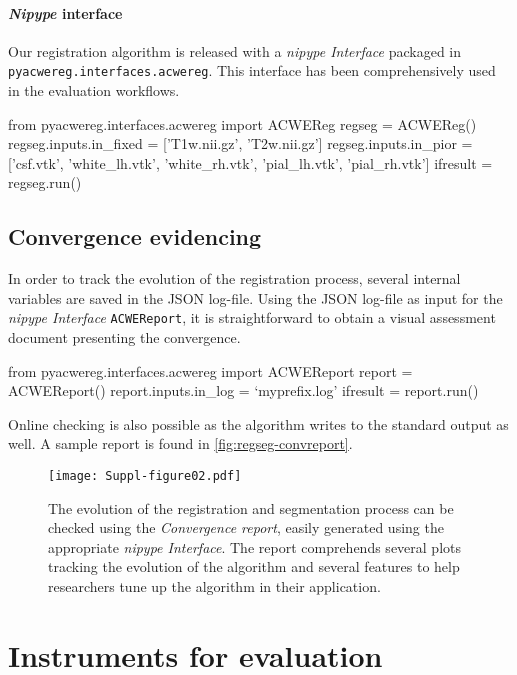 \documentclass[a4paper]{report}
\newcommand*{\codeinline}[1]{\colorbox{listingbg}{\lstinline!#1!}}
\begin{document}
\paragraph{\emph{Nipype} interface}
Our registration algorithm is released with a \emph{nipype Interface} packaged in
  \codeinline{pyacwereg.interfaces.acwereg}.
This interface has been comprehensively used in the evaluation workflows.

\begin{pythoncode}
from pyacwereg.interfaces.acwereg import ACWEReg
regseg = ACWEReg()
regseg.inputs.in_fixed = ['T1w.nii.gz', 'T2w.nii.gz']
regseg.inputs.in_pior = ['csf.vtk', 'white_lh.vtk', 'white_rh.vtk',
                         'pial_lh.vtk', 'pial_rh.vtk']
ifresult = regseg.run()
\end{pythoncode}


\subsection{Convergence evidencing}\label{sec:regseg-convergence_evidence}

In order to track the evolution of the registration process, several internal variables
  are saved in the JSON log-file.
Using the JSON log-file as input for the \emph{nipype Interface}
  \codeinline{ACWEReport}, it is straightforward to obtain
  a visual assessment document presenting the convergence.
\begin{pythoncode}
from pyacwereg.interfaces.acwereg import ACWEReport
report = ACWEReport()
report.inputs.in_log = `myprefix.log'
ifresult = report.run()
\end{pythoncode}

Online checking is also possible as the algorithm writes to the standard output as well.
A sample report is found in \autoref{fig:regseg-convreport}.

\begin{figure}[b]
  \texttt{[image: Suppl-figure02.pdf]}
  \caption{The evolution of the registration and segmentation process can be
    checked using the \emph{Convergence report},
    easily generated using the appropriate \emph{nipype Interface}.
  The report comprehends several plots tracking the evolution of the algorithm and several
    features to help researchers tune up the algorithm in their application.}%
    \label{fig:regseg-convreport}
\end{figure}

\clearpage
\section{Instruments for evaluation}
\end{document}
